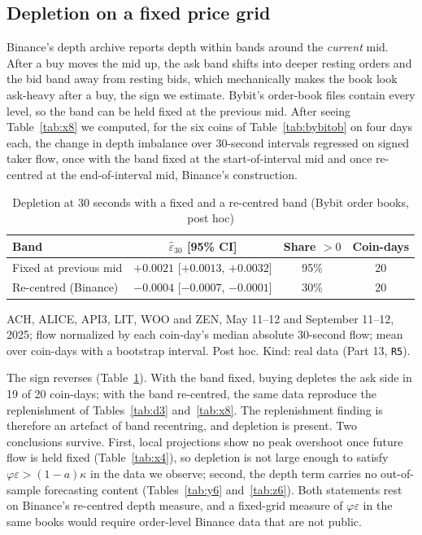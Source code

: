 \documentclass[12pt]{article}
\theoremstyle{definition}
\theoremstyle{remark}
\begin{document}
\subsection{Depletion on a fixed price grid}\label{sec:fixedgrid}
Binance's depth archive reports depth within bands around the \emph{current} mid. After a buy moves the mid up, the ask band shifts into deeper resting orders and the bid band away from resting bids, which mechanically makes the book look ask-heavy after a buy, the sign we estimate. Bybit's order-book files contain every level, so the band can be held fixed at the previous mid. After seeing Table~\ref{tab:x8} we computed, for the six coins of Table~\ref{tab:bybitob} on four days each, the change in depth imbalance over 30-second intervals regressed on signed taker flow, once with the band fixed at the start-of-interval mid and once re-centred at the end-of-interval mid, Binance's construction.

\begin{table}[t]\centering\small
\begin{threeparttable}
\caption{Depletion at 30 seconds with a fixed and a re-centred band (Bybit order books, post hoc)}\label{tab:fixedgrid}
\begin{tabular}{lccc}
\toprule
Band & $\hat\varepsilon_{30}$ [95\% CI] & Share $>0$ & Coin-days\\
\midrule
Fixed at previous mid & $+0.0021$ [$+0.0013$, $+0.0032$] & 95\% & 20\\
Re-centred (Binance) & $-0.0004$ [$-0.0007$, $-0.0001$] & 30\% & 20\\
\bottomrule
\end{tabular}
\begin{tablenotes}\footnotesize\item ACH, ALICE, API3, LIT, WOO and ZEN, May 11--12 and September 11--12, 2025; flow normalized by each coin-day's median absolute 30-second flow; mean over coin-days with a bootstrap interval. Post hoc. Kind: real data (Part 13, \texttt{R5}).\end{tablenotes}
\end{threeparttable}
\end{table}

The sign reverses (Table~\ref{tab:fixedgrid}). With the band fixed, buying depletes the ask side in 19 of 20 coin-days; with the band re-centred, the same data reproduce the replenishment of Tables~\ref{tab:d3} and~\ref{tab:x8}. The replenishment finding is therefore an artefact of band recentring, and depletion is present. Two conclusions survive. First, local projections show no peak overshoot once future flow is held fixed (Table~\ref{tab:x4}), so depletion is not large enough to satisfy $\varphi\varepsilon>(1-a)\kappa$ in the data we observe; second, the depth term carries no out-of-sample forecasting content (Tables~\ref{tab:y6} and~\ref{tab:z6}). Both statements rest on Binance's re-centred depth measure, and a fixed-grid measure of $\varphi\varepsilon$ in the same books would require order-level Binance data that are not public.
\end{document}
